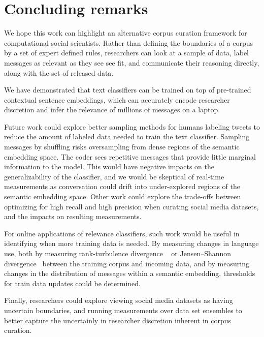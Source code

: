 \section{Concluding remarks}
\label{sec:corpusCreation.concludingremarks}



We hope this work can highlight
an alternative corpus curation framework
for computational social scientists. 
Rather than defining the boundaries of a corpus by a set of expert defined rules,
researchers can look at a sample of data, 
label messages as relevant as they see see fit,
and communicate their reasoning directly,
along with the set of released data.

We have demonstrated that text classifiers can be trained on top of pre-trained contextual sentence embeddings,
which can accurately encode researcher discretion
and infer the relevance of millions of messages on a laptop. %




Future work could explore better sampling methods for humans labeling tweets
to reduce the amount of labeled data needed to train the text classifier. 
Sampling messages by shuffling
risks oversampling
from dense regions of the semantic embedding space. 
The coder sees repetitive messages that provide little marginal 
information to the model.
This would have negative impacts on the generalizability of the classifier, and we would be skeptical of real-time measurements as conversation could drift into under-explored regions of the semantic embedding space.
Other work could explore the trade-offs between optimizing for high recall and high precision when curating  social media datasets, and the impacts on resulting measurements. 

For online applications of relevance classifiers, such work would be useful in identifying when more training data is needed. 
By measuring changes in language use, both by measuring rank-turbulence divergence ~\cite{dodds2020allotaxonometry}
or Jensen–Shannon divergence~\cite{dhillon2003divisive} between the training corpus and incoming data,
and by measuring changes in the distribution of messages within a semantic embedding, thresholds for train data updates could be determined.

Finally, researchers could explore viewing social media datasets as having uncertain boundaries, 
and running measurements over data set ensembles
to better capture the uncertainly in researcher discretion inherent in corpus curation.